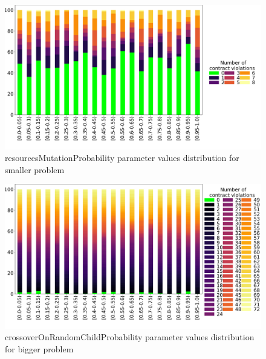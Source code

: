 \begin{figure}
	\centering
	\includegraphics[width=\textwidth]{images/DistrValiditySmall/resourcesMutationProbability.pdf}
	\caption[resourcesMutationProbability parameter values distribution for smaller problem]{resourcesMutationProbability parameter values distribution for smaller problem}
	\label{fig:resourcesMutationProbability_DistSmall}
\end{figure}
\begin{figure}
	\centering
	\includegraphics[width=\textwidth]{images/DistrValidityBig/crossoverOnRandomChildProbability.pdf}
	\caption[crossoverOnRandomChildProbability parameter values distribution for bigger problem]{crossoverOnRandomChildProbability parameter values distribution for bigger problem}
	\label{fig:crossoverOnRandomChildProbability_DistBig}
\end{figure}
